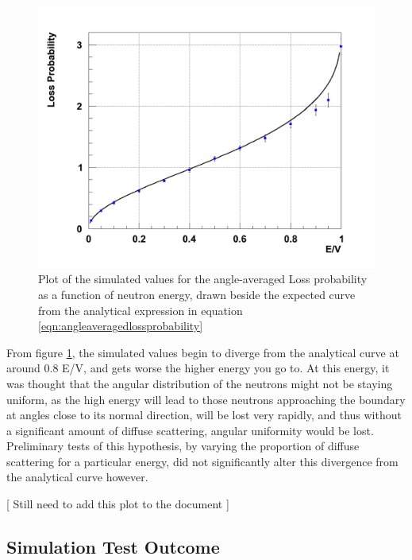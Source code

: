 \documentclass[11pt,a4paper,oneside]{article}
\begin{document}
\begin{figure}[!htbp] 	
\begin{center}
\includegraphics[scale=0.3]{figures/LossFunction-1000}
\end{center}
\caption{Plot of the simulated values for the angle-averaged Loss probability as a function of neutron energy, drawn beside the expected curve from the analytical expression in equation \ref{eqn:angleaveragedlossprobability}}
\label{fig:simulatedangleavragedlossprob}
\end{figure}

From figure \ref{fig:simulatedangleavragedlossprob}, the simulated values begin to diverge from the analytical curve at around 0.8 E/V, and gets worse the higher energy you go to. At this energy, it was thought that the angular distribution of the neutrons might not be staying uniform, as the high energy will lead to those neutrons approaching the boundary at angles close to its normal direction, will be lost very rapidly, and thus without a significant amount of diffuse scattering, angular uniformity would be lost. Preliminary tests of this hypothesis, by varying the proportion of diffuse scattering for a particular energy, did not significantly alter this divergence from the analytical curve however. 

[ Still need to add this plot to the document ]

\subsection*{Simulation Test Outcome}
\end{document}
